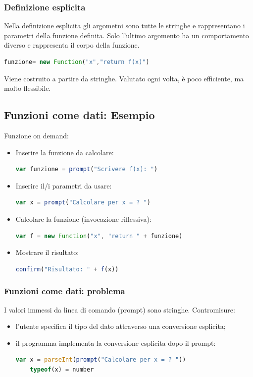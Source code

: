 \documentclass{article}
\begin{document}
\subsubsection{Definizione esplicita}
Nella definizione esplicita gli argometni sono tutte le stringhe e rappresentano i parametri della funzione definita. Solo l'ultimo argomento ha un comportamento diverso e rappresenta il corpo della funzione.
\begin{lstlisting}[language=JavaScript]
funzione= new Function("x","return f(x)")
\end{lstlisting}
Viene costruito a partire da stringhe. Valutato ogni volta, è poco efficiente, ma molto flessibile.
\subsection{Funzioni come dati: Esempio}
Funzione on demand:
\begin{itemize}
    \item Inserire la funzione da calcolare:
          \begin{lstlisting}[language=JavaScript]
    var funzione = prompt("Scrivere f(x): ")
    \end{lstlisting}
    \item Inserire il/i parametri da usare:
          \begin{lstlisting}[language=JavaScript]
    var x = prompt("Calcolare per x = ? ")
    \end{lstlisting}
    \item Calcolare la funzione (invocazione riflessiva):
          \begin{lstlisting}[language=JavaScript]
    var f = new Function("x", "return " + funzione)
    \end{lstlisting}
    \item Mostrare il risultato:
          \begin{lstlisting}[language=JavaScript]
    confirm("Risultato: " + f(x))
    \end{lstlisting}
\end{itemize}
\subsubsection{Funzioni come dati: problema}
I valori immessi da linea di comando (prompt) sono stringhe. Contromisure:
\begin{itemize}
    \item l'utente specifica il tipo del dato attraverso una conversione esplicita;
    \item il programma implementa la conversione esplicita dopo il prompt:
          \begin{lstlisting}[language=JavaScript]
    var x = parseInt(prompt("Calcolare per x = ? "))
    typeof(x) = number
    \end{lstlisting}
\end{itemize}
\end{document}
